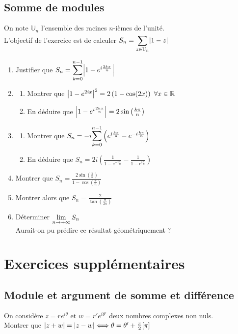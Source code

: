\documentclass[oneside,12pt]{book}          %
\begin{document}
\subsection{Somme de modules}
On note $\mathbb{U}_n$ l'ensemble des racines $n$-ièmes de l'unité.\\
L'objectif de l'exercice est de calculer $S_n={\displaystyle\sum_{z\in\mathbb{U}_n}^{}}{\left\lvert 1-z \right\rvert}$
\begin{enumerate}
	\item Justifier que $S_n={\displaystyle\sum_{k=0}^{n-1}}{\left\lvert 1-e^{i\frac{2k\pi}{n}} \right\rvert}$
	\item \begin{enumerate}
		\item Montrer que ${\left\lvert 1-e^{2ix} \right\rvert}^2=2\left(1-\cos(2x)\right)$ \quad $\forall{x\in\mathbb R}$
		\item En déduire que ${\left\lvert 1-e^{i\frac{2k\pi}{n}} \right\rvert}=2\sin\left(\frac{k\pi}{n}\right)$
	\end{enumerate}
	\item \begin{enumerate}
		\item Montrer que $S_n=-i{\displaystyle\sum_{k=0}^{n-1}}\left(e^{i\frac{k\pi}{n}}-e^{-i\frac{k\pi}{n}}\right)$
		\item En déduire que $S_n=2i\left(\frac{1}{1-e^{-i\frac{\pi}{n}}}-\frac{1}{1-e^{i\frac{\pi}{n}}}\right)$
	\end{enumerate}
	\item Montrer que $S_n=\frac{2\sin\left(\frac{\pi}{n}\right)}{1-\cos\left(\frac{\pi}{n}\right)}$
	\item Montrer alors que $S_n=\frac{2}{\tan\left(\frac{\pi}{2n}\right)}$
	\item Déterminer ${\lim\limits_{n\to +\infty}}\, S_n$\\
	Aurait-on pu prédire ce résultat géométriquement ?
\end{enumerate}




\section{Exercices supplémentaires}

\subsection{Module et argument de somme et différence}

On considère $z=re^{i\theta}$ et $w=r'e^{i\theta'}$ deux nombres complexes non nuls. \\
Montrer que ${\left\lvert z+w \right\rvert}={\left\lvert z-w \right\rvert}\Longleftrightarrow \theta=\theta'+\frac{\pi}{2} [\pi]$
\end{document}
